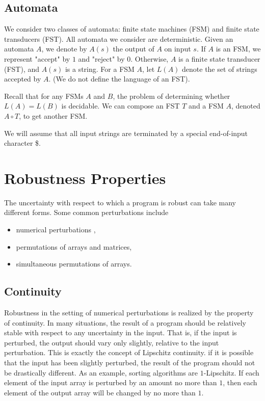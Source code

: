 \documentclass{llncs}
\begin{document}
\subsection{Automata}
We consider two classes of automata: finite state machines (FSM) and finite state transducers (FST). All automata we consider are deterministic. Given an automata $A$, we denote by $A(s)$ the output of $A$ on input $s$. If $A$ is an FSM, we represent "accept" by $1$ and "reject" by $0$. Otherwise, $A$ is a finite state transducer (FST), and $A(s)$ is a string. For a FSM $A$, let $L(A)$ denote the set of strings accepted by $A$. (We do not define the language of an FST).

Recall that for any FSMs $A$ and $B$, the problem of determining whether $L(A) = L(B)$ is decidable. We can compose an FST $T$ and a FSM $A$, denoted $A \circ T$, to get another FSM.

We will assume that all input strings are terminated by a special end-of-input character \$.

\section{Robustness Properties}

The uncertainty with respect to which a program is robust can take many different forms.  Some common perturbations include
\begin{itemize}
\item numerical perturbations \cite{samanta14,chaudhuri10,chaudhuri11},
\item permutations of arrays and matrices,
\item simultaneous permutations of arrays.
\end{itemize}

\subsection{Continuity}

Robustness in the setting of numerical perturbations is realized by the property of continuity.  In many situations, the result of a program should be relatively stable with respect to any uncertainty in the input.  That is, if the input is perturbed, the output should vary only slightly, relative to the input perturbation.  This is exactly the concept of Lipschitz continuity.  if it is possible that the input has been slightly perturbed, the result of the program should not be drastically different.  As an example, sorting algorithms are \(1\)-Lipschitz.  If each element of the input array is perturbed by an amount no more than \(1\), then each element of the output array will be changed by no more than \(1\).
\end{document}

